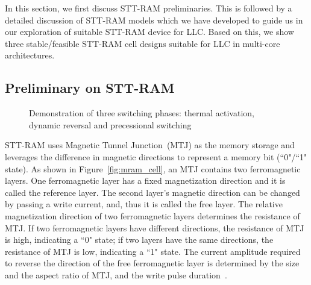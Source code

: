 In this section, we first discuss STT-RAM preliminaries. This is followed by a detailed discussion of
STT-RAM models which we have developed to guide us in our exploration of suitable STT-RAM device for
LLC. Based on this, we show three stable/feasible STT-RAM cell designs
suitable for LLC in multi-core architectures.

\subsection{Preliminary on STT-RAM}


\begin{figure*} [t]
\centering
\begin{minipage}{0.575\textwidth}
\centering
 \caption{\label{fig:mram_cell} (a) Structural view of an STT-RAM Cache Cell
 (b) Anti Space Parallel High Resistance, Indicating ``0" state (c) Parallel Low Resistance, Indicating ``1" state}
\end{minipage}
\hfill
\begin{minipage}{0.375\textwidth}
\centering
 \caption{\label{fig:IcWt} Demonstration of three switching phases:
 thermal activation, dynamic reversal and precessional switching }
\end{minipage}
\end{figure*}

STT-RAM uses Magnetic Tunnel Junction~(MTJ) as the memory storage and leverages the difference in
magnetic directions to represent a memory bit (``0"/``1" state). As shown in
Figure~\ref{fig:mram_cell}, an MTJ contains two ferromagnetic layers. One ferromagnetic layer has a
fixed magnetization direction and it is called the reference layer. The second layer's magnetic
direction can be changed by passing a write current, and, thus it is called the free layer. The
relative magnetization direction of two ferromagnetic layers determines the resistance of MTJ.  If
two ferromagnetic layers have different directions, the resistance of MTJ is high, indicating a ``0"
state; if two layers have the same directions, the resistance of MTJ is low, indicating a ``1"
state. The current amplitude required to reverse the
direction of the free ferromagnetic layer is determined by the size and the aspect ratio of MTJ, and
the write pulse duration~\cite{STTRAM:JAP07, STTRAM:Qualcomm09}.

